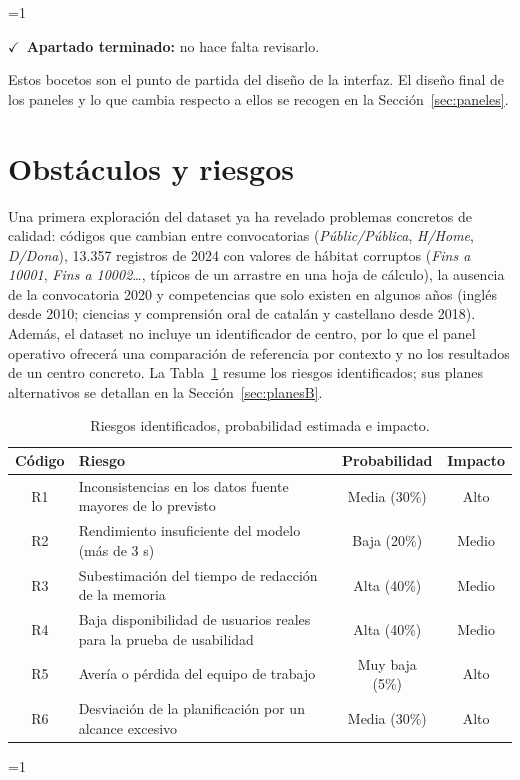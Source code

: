 \documentclass[12pt, a4paper, oneside]{report}
\newcommand{\mostrarterminados}{1}
\newenvironment{revisado}
  {\ifnum\mostrarterminados=1\relax\begin{cajarevisada}\noindent\colorbox{verdeterminado}{\parbox{\dimexpr\linewidth-2\fboxsep\relax}{\small$\checkmark$\ \textbf{Apartado terminado:} no hace falta revisarlo.}}\par\medskip\fi}
  {\ifnum\mostrarterminados=1\relax\end{cajarevisada}\fi}
\begin{document}
\begin{revisado}
Estos bocetos son el punto de partida del diseño de la interfaz. El diseño final de los paneles y lo que cambia respecto a ellos se recogen en la Sección~\ref{sec:paneles}.

\section{Obstáculos y riesgos}
\label{sec:riesgos}
Una primera exploración del dataset ya ha revelado problemas concretos de calidad: códigos que cambian entre convocatorias (\textit{Públic/Pública}, \textit{H/Home}, \textit{D/Dona}), 13.357 registros de 2024 con valores de hábitat corruptos (\textit{Fins a 10001}, \textit{Fins a 10002}\ldots, típicos de un arrastre en una hoja de cálculo), la ausencia de la convocatoria 2020 y competencias que solo existen en algunos años (inglés desde 2010; ciencias y comprensión oral de catalán y castellano desde 2018). Además, el dataset no incluye un identificador de centro, por lo que el panel operativo ofrecerá una comparación de referencia por contexto y no los resultados de un centro concreto. La Tabla~\ref{tab:riesgos} resume los riesgos identificados; sus planes alternativos se detallan en la Sección~\ref{sec:planesB}.

\begin{table}[H]
\centering
\small
\renewcommand{\arraystretch}{1.1}
\begin{tabularx}{\textwidth}{@{} c X c c @{}}
\toprule
\textbf{Código} & \textbf{Riesgo} & \textbf{Probabilidad} & \textbf{Impacto} \\ \midrule
R1 & Inconsistencias en los datos fuente mayores de lo previsto & Media (30\%) & Alto \\
R2 & Rendimiento insuficiente del modelo (más de 3 s) & Baja (20\%) & Medio \\
R3 & Subestimación del tiempo de redacción de la memoria & Alta (40\%) & Medio \\
R4 & Baja disponibilidad de usuarios reales para la prueba de usabilidad & Alta (40\%) & Medio \\
R5 & Avería o pérdida del equipo de trabajo & Muy baja (5\%) & Alto \\
R6 & Desviación de la planificación por un alcance excesivo & Media (30\%) & Alto \\ \bottomrule
\end{tabularx}
\caption{Riesgos identificados, probabilidad estimada e impacto.}
\label{tab:riesgos}
\end{table}
\end{revisado}
\end{document}
